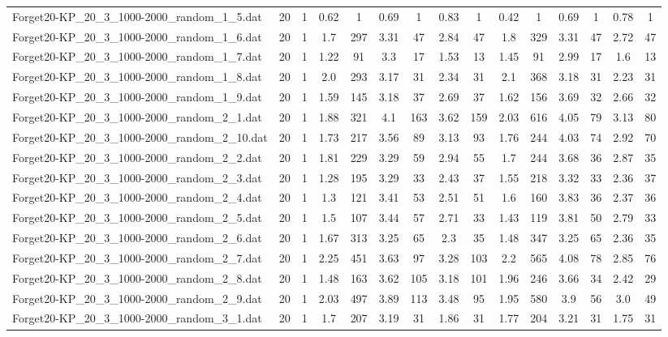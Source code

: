 \begin{table}[!ht]
{\begin{tabular}{lcccccccccccccc}
Forget20-KP\_20\_3\_1000-2000\_random\_1\_5.dat & 20 & 1 & 0.62 & 1 & 0.69 & 1 & 0.83 & 1 & 0.42 & 1 & 0.69 & 1 & 0.78 & 1 \\
Forget20-KP\_20\_3\_1000-2000\_random\_1\_6.dat & 20 & 1 & 1.7 & 297 & 3.31 & 47 & 2.84 & 47 & 1.8 & 329 & 3.31 & 47 & 2.72 & 47 \\
Forget20-KP\_20\_3\_1000-2000\_random\_1\_7.dat & 20 & 1 & 1.22 & 91 & 3.3 & 17 & 1.53 & 13 & 1.45 & 91 & 2.99 & 17 & 1.6 & 13 \\
Forget20-KP\_20\_3\_1000-2000\_random\_1\_8.dat & 20 & 1 & 2.0 & 293 & 3.17 & 31 & 2.34 & 31 & 2.1 & 368 & 3.18 & 31 & 2.23 & 31 \\
Forget20-KP\_20\_3\_1000-2000\_random\_1\_9.dat & 20 & 1 & 1.59 & 145 & 3.18 & 37 & 2.69 & 37 & 1.62 & 156 & 3.69 & 32 & 2.66 & 32 \\
Forget20-KP\_20\_3\_1000-2000\_random\_2\_1.dat & 20 & 1 & 1.88 & 321 & 4.1 & 163 & 3.62 & 159 & 2.03 & 616 & 4.05 & 79 & 3.13 & 80 \\
Forget20-KP\_20\_3\_1000-2000\_random\_2\_10.dat & 20 & 1 & 1.73 & 217 & 3.56 & 89 & 3.13 & 93 & 1.76 & 244 & 4.03 & 74 & 2.92 & 70 \\
Forget20-KP\_20\_3\_1000-2000\_random\_2\_2.dat & 20 & 1 & 1.81 & 229 & 3.29 & 59 & 2.94 & 55 & 1.7 & 244 & 3.68 & 36 & 2.87 & 35 \\
Forget20-KP\_20\_3\_1000-2000\_random\_2\_3.dat & 20 & 1 & 1.28 & 195 & 3.29 & 33 & 2.43 & 37 & 1.55 & 218 & 3.32 & 33 & 2.36 & 37 \\
Forget20-KP\_20\_3\_1000-2000\_random\_2\_4.dat & 20 & 1 & 1.3 & 121 & 3.41 & 53 & 2.51 & 51 & 1.6 & 160 & 3.83 & 36 & 2.37 & 36 \\
Forget20-KP\_20\_3\_1000-2000\_random\_2\_5.dat & 20 & 1 & 1.5 & 107 & 3.44 & 57 & 2.71 & 33 & 1.43 & 119 & 3.81 & 50 & 2.79 & 33 \\
Forget20-KP\_20\_3\_1000-2000\_random\_2\_6.dat & 20 & 1 & 1.67 & 313 & 3.25 & 65 & 2.3 & 35 & 1.48 & 347 & 3.25 & 65 & 2.36 & 35 \\
Forget20-KP\_20\_3\_1000-2000\_random\_2\_7.dat & 20 & 1 & 2.25 & 451 & 3.63 & 97 & 3.28 & 103 & 2.2 & 565 & 4.08 & 78 & 2.85 & 76 \\
Forget20-KP\_20\_3\_1000-2000\_random\_2\_8.dat & 20 & 1 & 1.48 & 163 & 3.62 & 105 & 3.18 & 101 & 1.96 & 246 & 3.66 & 34 & 2.42 & 29 \\
Forget20-KP\_20\_3\_1000-2000\_random\_2\_9.dat & 20 & 1 & 2.03 & 497 & 3.89 & 113 & 3.48 & 95 & 1.95 & 580 & 3.9 & 56 & 3.0 & 49 \\
Forget20-KP\_20\_3\_1000-2000\_random\_3\_1.dat & 20 & 1 & 1.7 & 207 & 3.19 & 31 & 1.86 & 31 & 1.77 & 204 & 3.21 & 31 & 1.75 & 31 \\

\end{tabular}}
\end{table}
